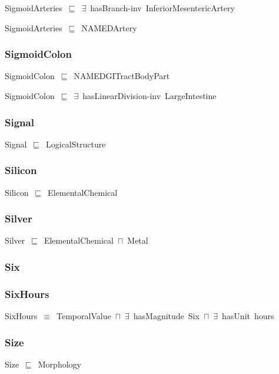 \documentclass{article}
\begin{document}
SigmoidArteries~\ensuremath{\sqsubseteq}~\ensuremath{\exists}~hasBranch-inv~InferiorMesentericArtery~

SigmoidArteries~\ensuremath{\sqsubseteq}~NAMEDArtery~

\subsubsection*{SigmoidColon}

SigmoidColon~\ensuremath{\sqsubseteq}~NAMEDGITractBodyPart~

SigmoidColon~\ensuremath{\sqsubseteq}~\ensuremath{\exists}~hasLinearDivision-inv~LargeIntestine~

\subsubsection*{Signal}

Signal~\ensuremath{\sqsubseteq}~LogicalStructure~

\subsubsection*{Silicon}

Silicon~\ensuremath{\sqsubseteq}~ElementalChemical~

\subsubsection*{Silver}

Silver~\ensuremath{\sqsubseteq}~ElementalChemical~\ensuremath{\sqcap}~Metal~

\subsubsection*{Six}

\subsubsection*{SixHours}

SixHours~\ensuremath{\equiv}~TemporalValue~\ensuremath{\sqcap}~\ensuremath{\exists}~hasMagnitude~Six~\ensuremath{\sqcap}~\ensuremath{\exists}~hasUnit~hours

\subsubsection*{Size}

Size~\ensuremath{\sqsubseteq}~Morphology~
\end{document}
